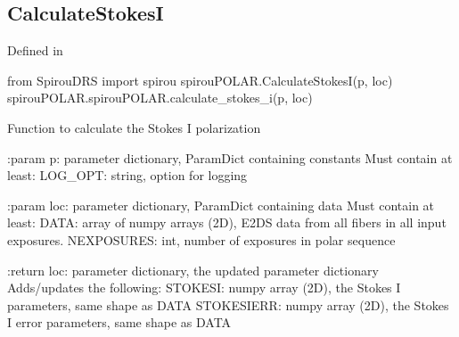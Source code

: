 
\noindent\begin{minipage}{\textwidth}
\subsection{CalculateStokesI}

Defined in \spirouPOLAR{}

\begin{pythonbox}
from SpirouDRS import spirou
spirouPOLAR.CalculateStokesI(p, loc)
spirouPOLAR.spirouPOLAR.calculate_stokes_i(p, loc)
\end{pythonbox}

\begin{pythondocstring}
Function to calculate the Stokes I polarization

:param p: parameter dictionary, ParamDict containing constants
    Must contain at least:
        LOG_OPT: string, option for logging
    
:param loc: parameter dictionary, ParamDict containing data
    Must contain at least:
        DATA: array of numpy arrays (2D), E2DS data from all fibers in
              all input exposures.
        NEXPOSURES: int, number of exposures in polar sequence
    
:return loc: parameter dictionary, the updated parameter dictionary
    Adds/updates the following:
        STOKESI: numpy array (2D), the Stokes I parameters, same shape as
                 DATA
        STOKESIERR: numpy array (2D), the Stokes I error parameters, same 
                    shape as DATA
\end{pythondocstring}
\end{minipage}


